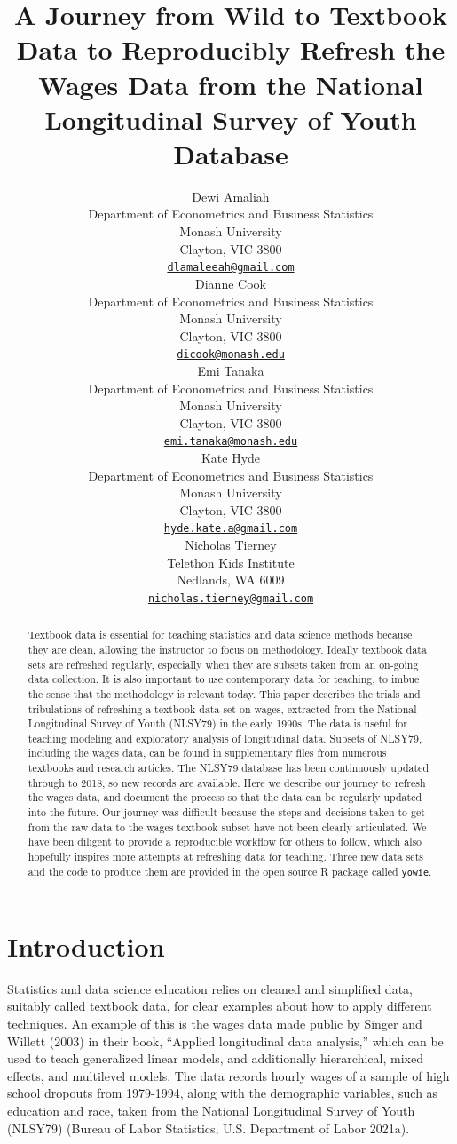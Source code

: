 \documentclass{article}
\title{A Journey from Wild to Textbook Data to Reproducibly Refresh the Wages Data from the National Longitudinal Survey of Youth Database}
\author{
    Dewi Amaliah
   \\
    Department of Econometrics and Business Statistics \\
    Monash University \\
  Clayton, VIC 3800 \\
  \texttt{\href{mailto:dlamaleeah@gmail.com}{\nolinkurl{dlamaleeah@gmail.com}}} \\
   \And
    Dianne Cook
   \\
    Department of Econometrics and Business Statistics \\
    Monash University \\
  Clayton, VIC 3800 \\
  \texttt{\href{mailto:dicook@monash.edu}{\nolinkurl{dicook@monash.edu}}} \\
   \And
    Emi Tanaka
   \\
    Department of Econometrics and Business Statistics \\
    Monash University \\
  Clayton, VIC 3800 \\
  \texttt{\href{mailto:emi.tanaka@monash.edu}{\nolinkurl{emi.tanaka@monash.edu}}} \\
   \And
    Kate Hyde
   \\
    Department of Econometrics and Business Statistics \\
    Monash University \\
  Clayton, VIC 3800 \\
  \texttt{\href{mailto:hyde.kate.a@gmail.com}{\nolinkurl{hyde.kate.a@gmail.com}}} \\
   \And
    Nicholas Tierney
   \\
    Telethon Kids Institute \\
  Nedlands, WA 6009 \\
  \texttt{\href{mailto:nicholas.tierney@gmail.com}{\nolinkurl{nicholas.tierney@gmail.com}}} \\
  }
\begin{document}
\maketitle


\begin{abstract}
Textbook data is essential for teaching statistics and data science methods because they are clean, allowing the instructor to focus on methodology. Ideally textbook data sets are refreshed regularly, especially when they are subsets taken from an on-going data collection. It is also important to use contemporary data for teaching, to imbue the sense that the methodology is relevant today. This paper describes the trials and tribulations of refreshing a textbook data set on wages, extracted from the National Longitudinal Survey of Youth (NLSY79) in the early 1990s. The data is useful for teaching modeling and exploratory analysis of longitudinal data. Subsets of NLSY79, including the wages data, can be found in supplementary files from numerous textbooks and research articles. The NLSY79 database has been continuously updated through to 2018, so new records are available. Here we describe our journey to refresh the wages data, and document the process so that the data can be regularly updated into the future. Our journey was difficult because the steps and decisions taken to get from the raw data to the wages textbook subset have not been clearly articulated. We have been diligent to provide a reproducible workflow for others to follow, which also hopefully inspires more attempts at refreshing data for teaching. Three new data sets and the code to produce them are provided in the open source R package called \texttt{yowie}.
\end{abstract}


\hypertarget{intro}{%
\section{Introduction}\label{intro}}

Statistics and data science education relies on cleaned and simplified data, suitably called textbook data, for clear examples about how to apply different techniques. An example of this is the wages data made public by Singer and Willett (2003) in their book, ``Applied longitudinal data analysis,'' which can be used to teach generalized linear models, and additionally hierarchical, mixed effects, and multilevel models. The data records hourly wages of a sample of high school dropouts from 1979-1994, along with the demographic variables, such as education and race, taken from the National Longitudinal Survey of Youth (NLSY79) (Bureau of Labor Statistics, U.S. Department of Labor 2021a).
\end{document}
